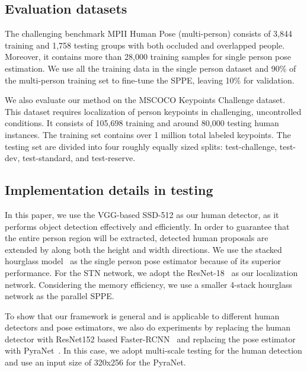 \documentclass[10pt,twocolumn,letterpaper]{article}
\begin{document}
\subsection{Evaluation datasets}
\vspace{2mm}
 The challenging benchmark MPII Human Pose (multi-person)\cite{andriluka14cvpr} consists of 3,844 training and 1,758 testing groups with both occluded and overlapped people. Moreover, it contains more than 28,000 training samples for single person pose estimation. We use all the training data in the single person dataset and 90\% of the multi-person training set to fine-tune the SPPE, leaving 10\% for validation.

\vspace{2mm}
 We also evaluate our method on the MSCOCO Keypoints Challenge dataset\cite{coco16}. This dataset requires localization of person keypoints in challenging, uncontrolled conditions. It consists of 105,698 training and around 80,000 testing human instances. The training set contains over 1 million total labeled keypoints. The testing set are divided into four roughly equally sized splits: test-challenge, test-dev, test-standard, and test-reserve.

\subsection{Implementation details in testing}
In this paper, we use the VGG-based SSD-512 \cite{liu2015ssd} as our human detector, as it performs object detection effectively and efficiently. In order to guarantee that the entire person region will be extracted, detected human proposals are extended by  along both the height and width directions. We use the stacked hourglass model~\cite{newell2016stacked} as the single person pose estimator because of its superior performance. For the STN network, we adopt the ResNet-18~\cite{he2016deep} as our localization network. Considering the memory efficiency, we use a smaller 4-stack hourglass network as the parallel SPPE.

\vspace{1mm}
To show that our framework is general and is applicable to different human detectors and pose estimators, we also do experiments by replacing the human detector with ResNet152 based Faster-RCNN~\cite{chen17implementation} and replacing the pose estimator with PyraNet~\cite{yang2017learning}. In this case, we adopt multi-scale testing for the human detection and use an input size of 320x256 for the PyraNet.
\end{document}
